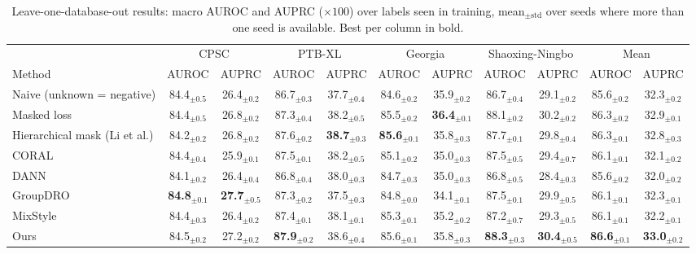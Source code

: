\begin{table}
\centering
\footnotesize
\setlength{\tabcolsep}{3pt}
\caption{Leave-one-database-out results: macro AUROC and AUPRC ($\times 100$) over labels seen in training, mean$_{\pm\mathrm{std}}$ over seeds where more than one seed is available. Best per column in bold.}
\label{tab:loso}
\begin{tabular}{lcccccccccc}
\toprule
 & \multicolumn{2}{c}{CPSC} & \multicolumn{2}{c}{PTB-XL} & \multicolumn{2}{c}{Georgia} & \multicolumn{2}{c}{Shaoxing-Ningbo} & \multicolumn{2}{c}{Mean} \\
\cmidrule(lr){2-3} \cmidrule(lr){4-5} \cmidrule(lr){6-7} \cmidrule(lr){8-9} \cmidrule(lr){10-11}
Method & AUROC & AUPRC & AUROC & AUPRC & AUROC & AUPRC & AUROC & AUPRC & AUROC & AUPRC \\
\midrule
Naive (unknown = negative) & 84.4$_{\pm 0.5}$ & 26.4$_{\pm 0.2}$ & 86.7$_{\pm 0.3}$ & 37.7$_{\pm 0.4}$ & 84.6$_{\pm 0.2}$ & 35.9$_{\pm 0.2}$ & 86.7$_{\pm 0.4}$ & 29.1$_{\pm 0.2}$ & 85.6$_{\pm 0.2}$ & 32.3$_{\pm 0.2}$ \\
Masked loss & 84.4$_{\pm 0.5}$ & 26.8$_{\pm 0.2}$ & 87.3$_{\pm 0.4}$ & 38.2$_{\pm 0.5}$ & 85.5$_{\pm 0.2}$ & \textbf{36.4}$_{\pm 0.1}$ & 88.1$_{\pm 0.2}$ & 30.2$_{\pm 0.2}$ & 86.3$_{\pm 0.2}$ & 32.9$_{\pm 0.1}$ \\
Hierarchical mask (Li et al.) & 84.2$_{\pm 0.2}$ & 26.8$_{\pm 0.2}$ & 87.6$_{\pm 0.2}$ & \textbf{38.7}$_{\pm 0.3}$ & \textbf{85.6}$_{\pm 0.1}$ & 35.8$_{\pm 0.3}$ & 87.7$_{\pm 0.1}$ & 29.8$_{\pm 0.4}$ & 86.3$_{\pm 0.1}$ & 32.8$_{\pm 0.3}$ \\
CORAL & 84.4$_{\pm 0.4}$ & 25.9$_{\pm 0.1}$ & 87.5$_{\pm 0.1}$ & 38.2$_{\pm 0.5}$ & 85.1$_{\pm 0.2}$ & 35.0$_{\pm 0.3}$ & 87.5$_{\pm 0.5}$ & 29.4$_{\pm 0.7}$ & 86.1$_{\pm 0.1}$ & 32.1$_{\pm 0.2}$ \\
DANN & 84.1$_{\pm 0.2}$ & 26.4$_{\pm 0.4}$ & 86.8$_{\pm 0.4}$ & 38.0$_{\pm 0.3}$ & 84.7$_{\pm 0.3}$ & 35.0$_{\pm 0.3}$ & 86.8$_{\pm 0.5}$ & 28.4$_{\pm 0.3}$ & 85.6$_{\pm 0.2}$ & 32.0$_{\pm 0.2}$ \\
GroupDRO & \textbf{84.8}$_{\pm 0.1}$ & \textbf{27.7}$_{\pm 0.5}$ & 87.3$_{\pm 0.2}$ & 37.5$_{\pm 0.3}$ & 84.8$_{\pm 0.0}$ & 34.1$_{\pm 0.1}$ & 87.5$_{\pm 0.1}$ & 29.9$_{\pm 0.5}$ & 86.1$_{\pm 0.1}$ & 32.3$_{\pm 0.1}$ \\
MixStyle & 84.4$_{\pm 0.3}$ & 26.4$_{\pm 0.2}$ & 87.4$_{\pm 0.1}$ & 38.1$_{\pm 0.1}$ & 85.3$_{\pm 0.1}$ & 35.2$_{\pm 0.2}$ & 87.2$_{\pm 0.7}$ & 29.3$_{\pm 0.5}$ & 86.1$_{\pm 0.1}$ & 32.2$_{\pm 0.1}$ \\
\midrule
Ours & 84.5$_{\pm 0.2}$ & 27.2$_{\pm 0.2}$ & \textbf{87.9}$_{\pm 0.2}$ & 38.6$_{\pm 0.4}$ & 85.6$_{\pm 0.1}$ & 35.8$_{\pm 0.3}$ & \textbf{88.3}$_{\pm 0.3}$ & \textbf{30.4}$_{\pm 0.5}$ & \textbf{86.6}$_{\pm 0.1}$ & \textbf{33.0}$_{\pm 0.2}$ \\
\bottomrule
\end{tabular}
\end{table}
